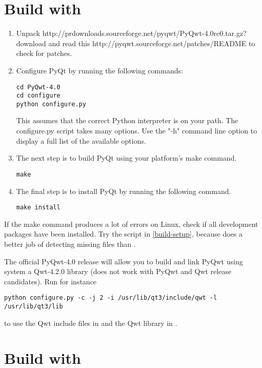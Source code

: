 \documentclass{manual}
\newcommand{\Download}{\ulink{download}
  {http://pyqwt.sourceforge.net/download.html}}
\newcommand{\PyQwtTarGz}{\ulink{PyQwt-4.0rc0.tar.gz}
  {http://prdownloads.sourceforge.net/pyqwt/PyQwt-4.0rc0.tar.gz?download}}
\newcommand{\ReadMePatches}{\ulink{README}
  {http://pyqwt.sourceforge.net/patches/README}}
\newcommand{\Future}{
  \begin{notice}[warning]
    This documentation is for the future PyQwt-4.0 which is only available from
    CVS. The \Download{} page has links for the latest releases.
  \end{notice}
}
\renewcommand{\Future}{}
\begin{document}
\section{Build with \label{build-configure}}

\Future{}

\begin{enumerate}
\item
  Unpack \PyQwtTarGz{} and read this \ReadMePatches{} to check for patches.
\item
  Configure PyQt by running the following commands:
\begin{verbatim}
cd PyQwt-4.0
cd configure
python configure.py
\end{verbatim}
  This assumes that the correct Python interpreter is on your path.
  The configure.py script takes many options.
  Use the "-h" command line option to display a full list of the available
  options.
\item
  The next step is to build PyQt using your platform's make command.
\begin{verbatim}
make
\end{verbatim}
\item
  The final step is to install PyQt by running the following command.
\begin{verbatim}
make install
\end{verbatim}
\end{enumerate}

\begin{notice}[warning]
  If the make command produces a lot of errors on Linux, check if all
  development packages have been installed.  Try the 
  script in \ref{build-setup}, because does a better job of detecting
  missing files than . 
\end{notice}

\begin{notice}[note]
  The official PyQwt-4.0 release will allow you to build and link
  PyQwt using system a Qwt-4.2.0 library (does not work with PyQwt and
  Qwt release candidates). Run for instance
\begin{verbatim}
python configure.py -c -j 2 -i /usr/lib/qt3/include/qwt -l /usr/lib/qt3/lib
\end{verbatim}
  to use the Qwt include files in  and
  the Qwt library in .
\end{notice}


\section{Build with \label{build-setup}}
\end{document}
